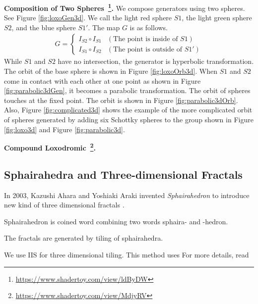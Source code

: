 \noindent\textbf{Composition of Two
Spheres~\footnote{\url{https://www.shadertoy.com/view/ldByDW}}.}
We compose generators using two spheres.
See Figure \ref{fig:loxoGen3d}.
We call the light red sphere $S1$, the light green sphere $S2$, and the blue
sphere $S1'$.
The map $G$ is as follows.
\begin{align*}
G =
\begin{cases}
 I_{S2} \circ I_{S1} & (\text{The point is inside of } S1) \\
 I_{S1} \circ I_{S2} & (\text{The point is outside of }S1')
\end{cases}
\end{align*}
While $S1$ and $S2$ have no intersection, the generator is hyperbolic
transformation.
The orbit of the base sphere is shown in Figure \ref{fig:loxoOrb3d}.
When $S1$ and $S2$ come in contact with each other at one point as shown
in Figure \ref{fig:parabolic3dGen}, it becomes a parabolic transformation.
The orbit of spheres touches at the fixed point.
The orbit is shown in Figure \ref{fig:parabolic3dOrb}.
Also, Figure \ref{fig:complicated3d} shows the example of the more
complicated orbit of spheres generated by adding six Schottky spheres to
the group shown in Figure \ref{fig:loxo3d} and Figure \ref{fig:parabolic3d}.

\noindent\textbf{Compound Loxodromic~\footnote{\url{https://www.shadertoy.com/view/MdjyRV}}.}

\subsection{Sphairahedra and Three-dimensional Fractals}


In 2003, Kazushi Ahara and Yoshiaki Araki invented
\textit{Sphairahedron} to introduce new kind of three dimensional
fractals \cite{ahara2003sphairahedral}.

Sphairahedron is coined word combining two words sphaira- and -hedron.

The fractals are generated by tiling of sphairahedra.

We use IIS for three dimensional tiling.
This method uses 
For more details, read \cite{bridges2018:171}